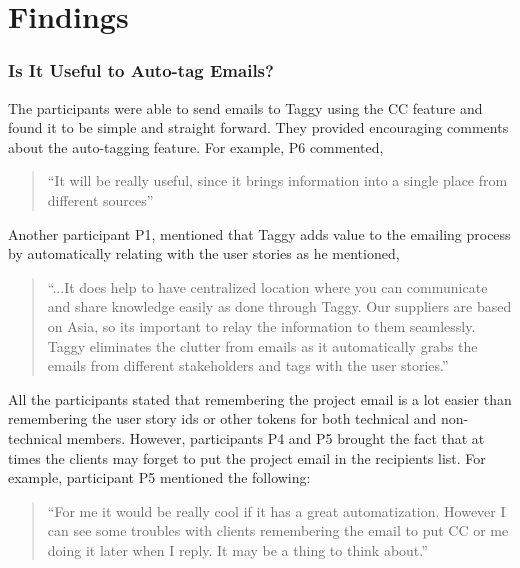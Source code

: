 \section{Findings}

\subsubsection{Is It Useful to Auto-tag Emails?}
The participants were able to send emails to Taggy using the CC feature and found it to be simple and straight forward. They provided encouraging comments about the auto-tagging feature. For example, P6 commented, 
\begin{quote}
	``It will be really useful, since it brings information into a single place from different sources''
\end{quote}

Another participant P1, mentioned that Taggy adds value to the emailing process by automatically relating with the user stories as he mentioned, 
\begin{quote}
``...It does help to have centralized location where you can communicate and share knowledge easily as done through Taggy. Our suppliers are based on Asia, so its important to relay the information to them seamlessly. Taggy eliminates the clutter from emails as it automatically grabs the emails from different stakeholders and tags with the user stories.''	
\end{quote}

All the participants stated that remembering the project email is a lot easier than remembering the user story ids or other tokens for both technical and non-technical members. However, participants P4 and P5 brought the fact that at times the clients may forget to put the project email in the recipients list. For example, participant P5 mentioned the following:
\begin{quote}
 ``For me it would be really cool if it has a great automatization. However I can see some troubles with clients remembering the email to put CC or me doing it later when I reply. It may be a thing to think about.''
\end{quote}

